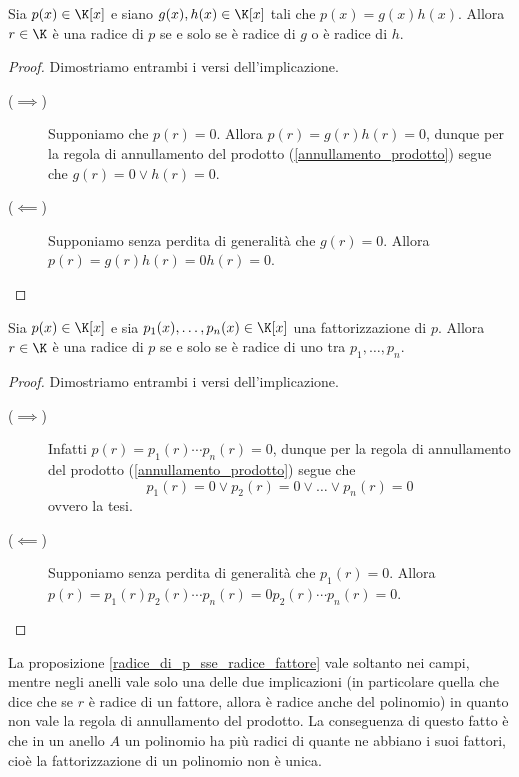 \begin{proposition}\label{radice_di_p_sse_radice_fattore}
    Sia $p(x) \in \K[x]$ e siano $g(x), h(x) \in \K[x]$ tali che $p(x) = g(x)h(x)$. Allora $r \in \K$ è una radice di $p$ se e solo se è radice di $g$ o è radice di $h$.
\end{proposition}
\begin{proof}
    Dimostriamo entrambi i versi dell'implicazione.
    \begin{description}
        \item[($\implies$)] Supponiamo che $p(r) = 0$. Allora $p(r) = g(r)h(r) = 0$, dunque per la regola di annullamento del prodotto (\ref{annullamento_prodotto}) segue che $g(r) = 0 \lor h(r) = 0$.
        \item[($\impliedby$)] Supponiamo senza perdita di generalità che $g(r) = 0$. Allora $p(r) = g(r)h(r) = 0h(r) = 0$. \qedhere 
    \end{description}
\end{proof}
\begin{corollary}
    Sia $p(x) \in \K[x]$ e sia $p_1(x), \dots, p_n(x) \in \K[x]$ una fattorizzazione di $p$. Allora $r \in \K$ è una radice di $p$ se e solo se è radice di uno tra $p_1, \dots, p_n$.
\end{corollary}
\begin{proof}
    Dimostriamo entrambi i versi dell'implicazione.
    \begin{description}
        \item[($\implies$)] Infatti $p(r) = p_1(r) \cdots p_n(r) = 0$, dunque per la regola di annullamento del prodotto (\ref{annullamento_prodotto}) segue che \[
            p_1(r) = 0 \lor p_2(r) = 0 \lor \dots \lor p_n(r) = 0    
        \] ovvero la tesi.
        \item[($\impliedby$)] Supponiamo senza perdita di generalità che $p_1(r) = 0$. Allora $p(r) = p_1(r)p_2(r)\cdots p_n(r) = 0p_2(r)\cdots p_n(r) = 0$. \qedhere
    \end{description} 
\end{proof}

\begin{remark}
    La proposizione \ref{radice_di_p_sse_radice_fattore} vale soltanto nei campi, mentre negli anelli vale solo una delle due implicazioni (in particolare quella che dice che se $r$ è radice di un fattore, allora è radice anche del polinomio) in quanto non vale la regola di annullamento del prodotto. La conseguenza di questo fatto è che in un anello $A$ un polinomio ha più radici di quante ne abbiano i suoi fattori, cioè la fattorizzazione di un polinomio non è unica.
\end{remark}

